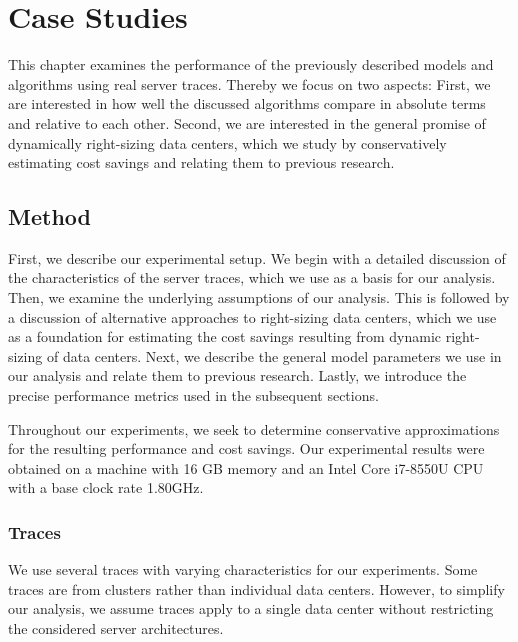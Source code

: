 
\chapter{Case Studies}\label{chapter:case_studies}

This chapter examines the performance of the previously described models and algorithms using real server traces. Thereby we focus on two aspects: First, we are interested in how well the discussed algorithms compare in absolute terms and relative to each other. Second, we are interested in the general promise of dynamically right-sizing data centers, which we study by conservatively estimating cost savings and relating them to previous research.

\section{Method}

First, we describe our experimental setup. We begin with a detailed discussion of the characteristics of the server traces, which we use as a basis for our analysis. Then, we examine the underlying assumptions of our analysis. This is followed by a discussion of alternative approaches to right-sizing data centers, which we use as a foundation for estimating the cost savings resulting from dynamic right-sizing of data centers. Next, we describe the general model parameters we use in our analysis and relate them to previous research. Lastly, we introduce the precise performance metrics used in the subsequent sections.

Throughout our experiments, we seek to determine conservative approximations for the resulting performance and cost savings. Our experimental results were obtained on a machine with 16 GB memory and an Intel Core i7-8550U CPU with a base clock rate 1.80GHz.

\subsection{Traces}\label{section:case_studies:method:traces}

We use several traces with varying characteristics for our experiments. Some traces are from clusters rather than individual data centers. However, to simplify our analysis, we assume traces apply to a single data center without restricting the considered server architectures.

